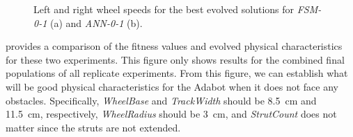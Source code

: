\begin{figure}[!ht]
    \centering





    \caption{Left and right wheel speeds for the best evolved solutions for \emph{FSM-0-1} (a) and \emph{ANN-0-1} (b).}
    \label{fig:ANN-0-1-best-speed}

\end{figure}


 provides a comparison of the fitness values and evolved physical characteristics for these two experiments.
%
This figure only shows results for the combined final populations of all replicate experiments.
%
From this figure, we can establish what will be good physical characteristics for the Adabot when it does not face any obstacles.
%
Specifically, \emph{WheelBase} and \emph{TrackWidth} should be 8.5~\si{cm} and 11.5~\si{cm}, respectively, \emph{WheelRadius} should be 3~\si{cm}, and \emph{StrutCount} does not matter since the struts are not extended.


